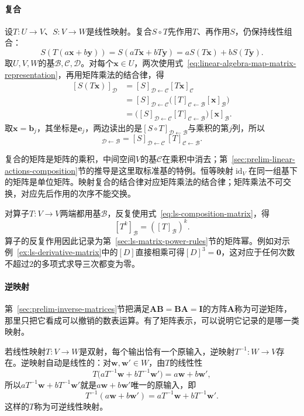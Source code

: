 \paragraph{复合}
设$T:U\to V$、$S:V\to W$是线性映射。复合$S\circ T$先作用$T$、再作用$S$，仍保持线性组合：
\[
 S(T(a\bm x+b\bm y))=S(aT\bm x+bT\bm y)=aS(T\bm x)+bS(T\bm y).
\]
取$U,V,W$的基$\mathcal B,\mathcal C,\mathcal D$。对每个$\bm x\in U$，两次使用式~\eqref{eq:linear-algebra-map-matrix-representation}，再用矩阵乘法的结合律，得
\[
 \begin{aligned}
 [S(T\bm x)]_{\mathcal D}
 &=[S]_{\mathcal D\leftarrow\mathcal C}[T\bm x]_{\mathcal C}\\
 &=[S]_{\mathcal D\leftarrow\mathcal C}\bigl([T]_{\mathcal C\leftarrow\mathcal B}[\bm x]_{\mathcal B}\bigr)\\
 &=\bigl([S]_{\mathcal D\leftarrow\mathcal C}[T]_{\mathcal C\leftarrow\mathcal B}\bigr)[\bm x]_{\mathcal B}.
 \end{aligned}
\]
取$\bm x=\bm b_j$，其坐标是$\bm e_j$，两边读出的是$[S\circ T]_{\mathcal D\leftarrow\mathcal B}$与乘积的第$j$列，所以
\begin{equation}
 [S\circ T]_{\mathcal D\leftarrow\mathcal B}
 =[S]_{\mathcal D\leftarrow\mathcal C}\,[T]_{\mathcal C\leftarrow\mathcal B}.
 \label{eq:ls-composition-matrix}
\end{equation}

复合的矩阵是矩阵的乘积，中间空间$V$的基$\mathcal C$在乘积中消去；第~\ref{sec:prelim-linear-actions-composition}节的推导是这里取标准基的特例。恒等映射$\operatorname{id}_V$在同一组基下的矩阵是单位矩阵。映射复合的结合律对应矩阵乘法的结合律；矩阵乘法不可交换，对应先后作用的次序不能交换。

对算子$T:V\to V$两端都用基$\mathcal B$，反复使用式~\eqref{eq:ls-composition-matrix}，得
\[
 [T^k]_{\mathcal B}=([T]_{\mathcal B})^k .
\]
算子的反复作用因此记录为第~\ref{sec:ls-matrix-power-rules}节的矩阵幂。例如对示例~\ref{ex:ls-derivative-matrix}中的$[D]$直接相乘可得$[D]^3=\bm0$，这对应于任何次数不超过$2$的多项式求导三次都变为零。

\paragraph{逆映射}
第~\ref{sec:prelim-inverse-matrices}节把满足$\bm A\bm B=\bm B\bm A=\bm I$的方阵$\bm A$称为可逆矩阵，那里只把它看成可以撤销的数表运算。有了矩阵表示，可以说明它记录的是哪一类映射。

若线性映射$T:V\to W$是双射，每个输出恰有一个原输入，逆映射$T^{-1}:W\to V$存在。逆映射自动是线性的：对$\bm w,\bm w'\in W$，由$T$的线性性
\[
 T\bigl(aT^{-1}\bm w+bT^{-1}\bm w'\bigr)=a\bm w+b\bm w',
\]
所以$aT^{-1}\bm w+bT^{-1}\bm w'$就是$a\bm w+b\bm w'$唯一的原输入，即
\[
 T^{-1}(a\bm w+b\bm w')=aT^{-1}\bm w+bT^{-1}\bm w'.
\]
这样的$T$称为可逆线性映射。


